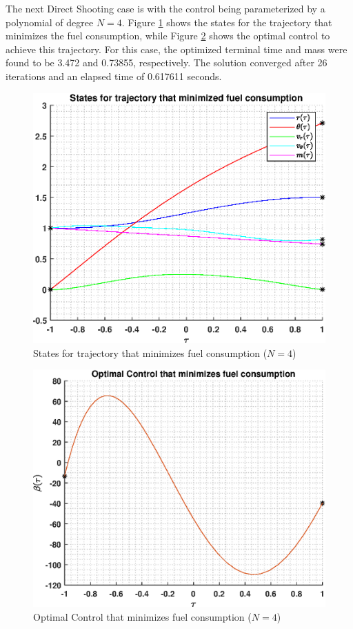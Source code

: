 \documentclass[]{article}
\begin{document}
The next Direct Shooting case is with the control being parameterized by a polynomial of degree \(N = 4\). Figure \ref{fig:directStatesPoly4} shows the states for the trajectory that minimizes the fuel consumption, while Figure \ref{fig:directControlPoly4} shows the optimal control to achieve this trajectory. For this case, the optimized terminal time and mass were found to be 3.472 and 0.73855, respectively. The solution converged after 26 iterations and an elapsed time of 0.617611 seconds.
\begin{figure}
	\centering
	\includegraphics[scale=0.75]{directStatesPoly4.eps}
	\caption{States for trajectory that minimizes fuel consumption (\(N = 4\))}
	\label{fig:directStatesPoly4}
\end{figure}
\begin{figure}
	\centering
	\includegraphics[scale=0.75]{directControlPoly4.eps}
	\caption{Optimal Control that minimizes fuel consumption (\(N = 4\))}
	\label{fig:directControlPoly4}
\end{figure}
\FloatBarrier
\end{document}
